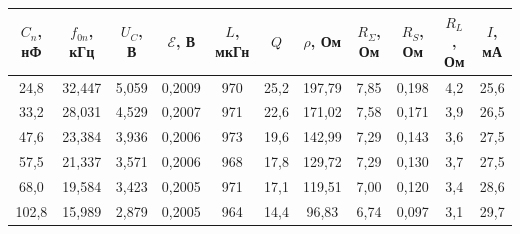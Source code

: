 \documentclass[a4paper, 12pt]{article}
\begin{document}
    \begin{table}[H]
        \centering
        \begin{tabular}{|ccccccccccc|}
        \hline
        \multicolumn{1}{|c|}{$C_n$, нФ} & \multicolumn{1}{c|}{$f_{0n}$, кГц} & \multicolumn{1}{c|}{$U_C$, В} & \multicolumn{1}{c|}{$\mathcal{E}$, В} & \multicolumn{1}{c|}{$L$, мкГн} & \multicolumn{1}{c|}{$Q$} & \multicolumn{1}{c|}{$\rho$, Ом} & \multicolumn{1}{c|}{$R_\Sigma$, Ом} & \multicolumn{1}{c|}{$R_S$, Ом} & \multicolumn{1}{c|}{$R_L$, Ом} & $I$, мА \\ \hline
        \multicolumn{1}{|c|}{24,8} & \multicolumn{1}{c|}{32,447} & \multicolumn{1}{c|}{5,059} & \multicolumn{1}{c|}{0,2009} & \multicolumn{1}{c|}{970} & \multicolumn{1}{c|}{25,2} & \multicolumn{1}{c|}{197,79} & \multicolumn{1}{c|}{7,85} & \multicolumn{1}{c|}{0,198} & \multicolumn{1}{c|}{4,2} & 25,6 \\ \hline
        \multicolumn{1}{|c|}{33,2} & \multicolumn{1}{c|}{28,031} & \multicolumn{1}{c|}{4,529} & \multicolumn{1}{c|}{0,2007} & \multicolumn{1}{c|}{971} & \multicolumn{1}{c|}{22,6} & \multicolumn{1}{c|}{171,02} & \multicolumn{1}{c|}{7,58} & \multicolumn{1}{c|}{0,171} & \multicolumn{1}{c|}{3,9} & 26,5 \\ \hline
        \multicolumn{1}{|c|}{47,6} & \multicolumn{1}{c|}{23,384} & \multicolumn{1}{c|}{3,936} & \multicolumn{1}{c|}{0,2006} & \multicolumn{1}{c|}{973} & \multicolumn{1}{c|}{19,6} & \multicolumn{1}{c|}{142,99} & \multicolumn{1}{c|}{7,29} & \multicolumn{1}{c|}{0,143} & \multicolumn{1}{c|}{3,6} & 27,5 \\ \hline
        \multicolumn{1}{|c|}{57,5} & \multicolumn{1}{c|}{21,337} & \multicolumn{1}{c|}{3,571} & \multicolumn{1}{c|}{0,2006} & \multicolumn{1}{c|}{968} & \multicolumn{1}{c|}{17,8} & \multicolumn{1}{c|}{129,72} & \multicolumn{1}{c|}{7,29} & \multicolumn{1}{c|}{0,130} & \multicolumn{1}{c|}{3,7} & 27,5 \\ \hline
        \multicolumn{1}{|c|}{68,0} & \multicolumn{1}{c|}{19,584} & \multicolumn{1}{c|}{3,423} & \multicolumn{1}{c|}{0,2005} & \multicolumn{1}{c|}{971} & \multicolumn{1}{c|}{17,1} & \multicolumn{1}{c|}{119,51} & \multicolumn{1}{c|}{7,00} & \multicolumn{1}{c|}{0,120} & \multicolumn{1}{c|}{3,4} & 28,6 \\ \hline
        \multicolumn{1}{|c|}{102,8} & \multicolumn{1}{c|}{15,989} & \multicolumn{1}{c|}{2,879} & \multicolumn{1}{c|}{0,2005} & \multicolumn{1}{c|}{964} & \multicolumn{1}{c|}{14,4} & \multicolumn{1}{c|}{96,83} & \multicolumn{1}{c|}{6,74} & \multicolumn{1}{c|}{0,097} & \multicolumn{1}{c|}{3,1} & 29,7 \\ \hline

\end{tabular}
\end{table}
\end{document}
